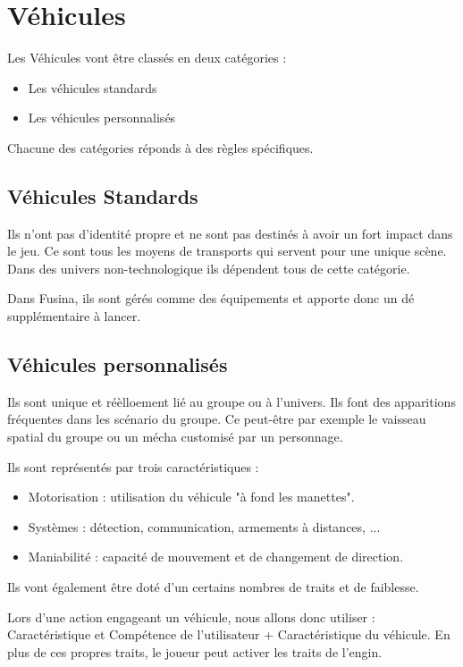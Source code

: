 \chapter{Véhicules}

\begin{multicols}{2}

Les Véhicules vont être classés en deux catégories : 
\begin{itemize}
\item Les véhicules standards
\item Les véhicules personnalisés
\end{itemize}

Chacune des catégories réponds à des règles spécifiques.

\section{Véhicules Standards}

Ils n'ont pas d'identité propre et ne sont pas destinés à avoir un fort impact dans le jeu. Ce sont tous les moyens de transports qui servent pour une unique scène. Dans des univers non-technologique ils dépendent tous de cette catégorie.

Dans Fusina, ils sont gérés comme des équipements et apporte donc un dé supplémentaire à lancer.

\section{Véhicules personnalisés}

Ils sont unique et réèlloement lié au groupe ou à l'univers. Ils font des apparitions fréquentes dans les scénario du groupe. Ce peut-être par exemple le vaisseau spatial du groupe ou un mécha customisé par un personnage.

Ils sont représentés par trois caractéristiques : 
\begin{itemize}
\item Motorisation : utilisation du véhicule "à fond les manettes".
\item Systèmes : détection, communication, armements à distances, ...
\item Maniabilité : capacité de mouvement et de changement de direction.
\end{itemize}

Ils vont également être doté d'un certains nombres de traits et de faiblesse.

Lors d'une action engageant un véhicule, nous allons donc utiliser : Caractéristique et Compétence de l'utilisateur + Caractéristique du véhicule. En plus de ces propres traits, le joueur peut activer les traits de l'engin.


\end{multicols}
